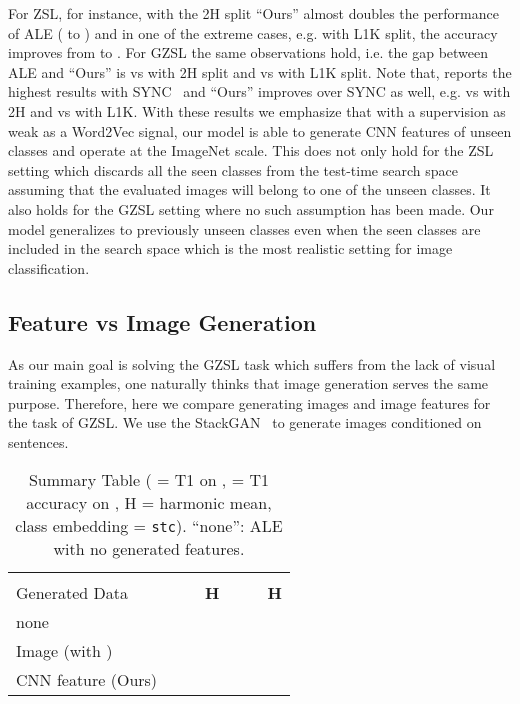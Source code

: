 \documentclass[10pt,twocolumn,letterpaper]{article}
\begin{document}
For ZSL, for instance, with the 2H split ``Ours'' almost doubles the performance of ALE ( to ) and in one of the extreme cases, e.g. with L1K split, the accuracy improves from  to . For GZSL the same observations hold, i.e. the gap between ALE and ``Ours'' is  vs  with 2H split and  vs  with L1K split. Note that, \cite{XSA17} reports the highest results with SYNC~\cite{CCGS16} and ``Ours'' improves over SYNC as well, e.g.  vs  with 2H and  vs  with L1K. With these results we emphasize that with a supervision as weak as a Word2Vec signal, our model is able to generate CNN features of unseen classes and operate at the ImageNet scale. This does not only hold for the ZSL setting which discards all the seen classes from the test-time search space assuming that the evaluated images will belong to one of the unseen classes. It also holds for the GZSL setting where no such assumption has been made. Our model generalizes to previously unseen classes even when the seen classes are included in the search space which is the most realistic setting for image classification. 



\subsection{Feature vs Image Generation}

As our main goal is solving the GZSL task which suffers from the lack of visual training examples, one naturally thinks that image generation serves the same purpose. Therefore, here we compare generating images and image features for the task of GZSL. We use the StackGAN~\cite{han2017stackgan} to generate  images conditioned on sentences. 




{
\setlength{\tabcolsep}{3.5pt}
\renewcommand{\arraystretch}{1.2}
\begin{table}[t]
 \centering
   \begin{tabular}{l c c c c c c}
   & \multicolumn{3}{c}{} & \multicolumn{3}{c}{} \\
   Generated Data &  &  & \textbf{H} &  &  & \textbf{H} \\ \hline
   none &  &  &  &  &  &  \\
Image (with \cite{han2017stackgan}) &  &  &  &  &  &  \\
   CNN feature (Ours) &  &  &  &  &  &  \\
\end{tabular} 
\caption{Summary Table ( = T1 on ,  = T1 accuracy on , H = harmonic mean, class embedding = \texttt{stc}). ``none'': ALE with no generated features. 
}
\label{tab:imggen}
\end{table}
}
\end{document}
